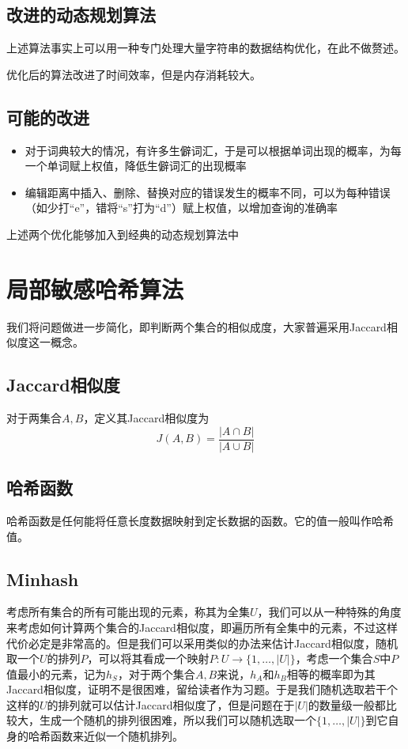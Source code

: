 \documentclass[a0,portrait,20pt]{a0poster}
\begin{document}
\begin{multicols}{2}
		\subsection*{改进的动态规划算法}
		上述算法事实上可以用一种专门处理大量字符串的数据结构优化，在此不做赘述。
		\par 优化后的算法改进了时间效率，但是内存消耗较大。
		\subsection*{可能的改进}
		\begin{itemize}
			\item 对于词典较大的情况，有许多生僻词汇，于是可以根据单词出现的概率，为每一个单词赋上权值，降低生僻词汇的出现概率
			\item 编辑距离中插入、删除、替换对应的错误发生的概率不同，可以为每种错误（如少打“e”，错将“s”打为“d”）赋上权值，以增加查询的准确率
		\end{itemize}
		\par 上述两个优化能够加入到经典的动态规划算法中
		\section{局部敏感哈希算法}
		我们将问题做进一步简化，即判断两个集合的相似成度，大家普遍采用Jaccard相似度这一概念。
		\subsection*{Jaccard相似度}
		对于两集合$A,B$，定义其Jaccard相似度为$$ J(A,B)=\frac{|A \cap B|}{|A \cup B|}$$
		\subsection*{哈希函数}
		哈希函数是任何能将任意长度数据映射到定长数据的函数。它的值一般叫作哈希值。
		\subsection*{Minhash}
		考虑所有集合的所有可能出现的元素，称其为全集$U$，我们可以从一种特殊的角度来考虑如何计算两个集合的Jaccard相似度，即遍历所有全集中的元素，不过这样代价必定是非常高的。但是我们可以采用类似的办法来估计Jaccard相似度，随机取一个$U$的排列$P$，可以将其看成一个映射$P:U\to \{1,\ldots,|U|\}$，考虑一个集合$S$中$P$值最小的元素，记为$h_S$，对于两个集合$A,B$来说，$h_A$和$h_B$相等的概率即为其Jaccard相似度，证明不是很困难，留给读者作为习题。于是我们随机选取若干个这样的$U$的排列就可以估计Jaccard相似度了，但是问题在于$|U|$的数量级一般都比较大，生成一个随机的排列很困难，所以我们可以随机选取一个$\{1,\ldots,|U|\}$到它自身的哈希函数来近似一个随机排列。

\end{multicols}
\end{document}
